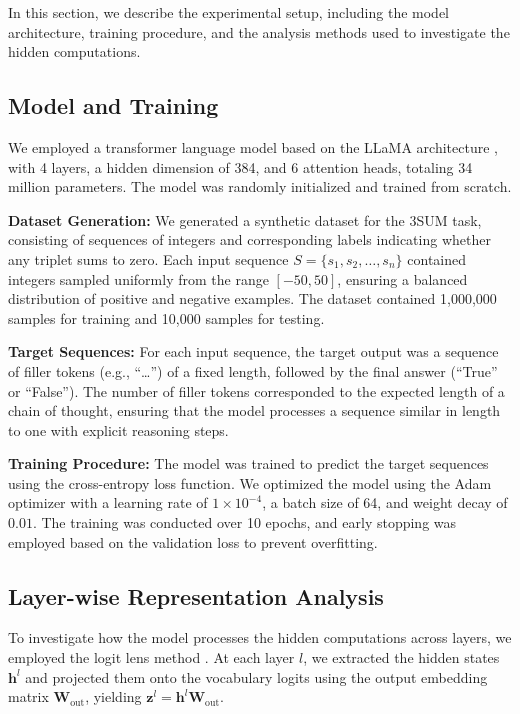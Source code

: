 \documentclass{article}
\begin{document}
In this section, we describe the experimental setup, including the model architecture, training procedure, and the analysis methods used to investigate the hidden computations.

\subsection{Model and Training}

We employed a transformer language model based on the LLaMA architecture \cite{touvron2023llama}, with 4 layers, a hidden dimension of 384, and 6 attention heads, totaling 34 million parameters. The model was randomly initialized and trained from scratch.

\textbf{Dataset Generation:} We generated a synthetic dataset for the 3SUM task, consisting of sequences of integers and corresponding labels indicating whether any triplet sums to zero. Each input sequence $S = \{s_1, s_2, \dots, s_n\}$ contained integers sampled uniformly from the range $[-50, 50]$, ensuring a balanced distribution of positive and negative examples. The dataset contained 1,000,000 samples for training and 10,000 samples for testing.

\textbf{Target Sequences:} For each input sequence, the target output was a sequence of filler tokens (e.g., ``\ldots'') of a fixed length, followed by the final answer (``True'' or ``False''). The number of filler tokens corresponded to the expected length of a chain of thought, ensuring that the model processes a sequence similar in length to one with explicit reasoning steps.

\textbf{Training Procedure:} The model was trained to predict the target sequences using the cross-entropy loss function. We optimized the model using the Adam optimizer with a learning rate of $1 \times 10^{-4}$, a batch size of 64, and weight decay of $0.01$. The training was conducted over 10 epochs, and early stopping was employed based on the validation loss to prevent overfitting.

\subsection{Layer-wise Representation Analysis}

To investigate how the model processes the hidden computations across layers, we employed the logit lens method \cite{nostalgebraist2020}. At each layer $l$, we extracted the hidden states $\mathbf{h}^l$ and projected them onto the vocabulary logits using the output embedding matrix $\mathbf{W}_{\text{out}}$, yielding $\mathbf{z}^l = \mathbf{h}^l \mathbf{W}_{\text{out}}$.
\end{document}
